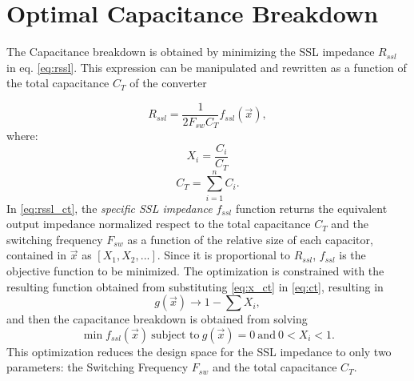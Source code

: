 \label{ap:optimitzation}
\section{Optimal Capacitance Breakdown}
\label{ap:opt_cap}
The Capacitance breakdown is obtained by minimizing the SSL impedance $R_{ssl}$ in eq. \eqref{eq:rssl}. This expression can be manipulated and rewritten as a function of the total capacitance $C_T$ of the converter

\begin{equation}
R_{ssl}=\frac{1}{2F_{sw} C_T } f_{ssl}\left(\vec{x}\right),
\label{eq:rssl_ct}
\end{equation}
where:
\begin{equation}
X_i = \frac{C_i}{C_T}
\label{eq:x_ct}
\end{equation}
\begin{equation}
C_T = \sum_{i=1}^n C_i.
\label{eq:ct}
\end{equation}
In \eqref{eq:rssl_ct}, the \emph{specific SSL impedance} $f_{ssl}$ function returns the equivalent output impedance normalized respect to the total capacitance $C_T$ and the switching frequency $F_{sw}$ as a function of the  relative size of each capacitor, contained in $\vec{x}$ as $[X_1,X_2,...]$. Since it is proportional to $R_{ssl}$,  $f_{ssl}$ is the objective function to be minimized. The optimization is constrained with the resulting function obtained from substituting \eqref{eq:x_ct} in \eqref{eq:ct}, resulting in
\begin{equation}
g(\vec{x}) \to 1- \sum X_i,
\label{eq:g_x}
\end{equation}
and then the capacitance breakdown is obtained from solving
\begin{equation}
\min{f_{ssl}(\vec{x})} \: \text{subject to} \: g(\vec{x}) = 0 \: \text{and} \: 0 < X_i < 1.
\label{eq:min_ssl}
\end{equation}
This optimization reduces the design space for the SSL impedance to only two parameters: the Switching Frequency $F_{sw}$ and the total capacitance $C_{T}$.

